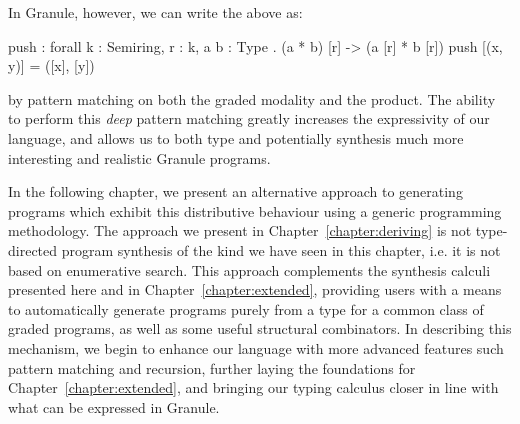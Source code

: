 In Granule, however, we can write the above as: 
\begin{granule}
push : forall {k : Semiring, r : k, a b : Type} . (a * b) [r] -> (a [r] * b [r])
push [(x, y)] = ([x], [y])
\end{granule}
by pattern matching on both the graded modality and the product. The ability to
perform this \emph{deep} pattern matching greatly increases the expressivity of
our language, and allows us to both type and potentially synthesis much more
interesting and realistic Granule programs.

In the following chapter, we present an alternative approach to generating
programs which exhibit this distributive behaviour using a generic programming
methodology. The approach we present in Chapter~\ref{chapter:deriving} is not
type-directed program synthesis of the kind we have seen in this chapter, i.e.
it is not based on enumerative search. This approach complements the synthesis
calculi presented here and in Chapter~\ref{chapter:extended}, providing users
with a means to automatically generate programs purely from a type for a common
class of graded programs, as well as some useful structural combinators. In
describing this mechanism, we begin to enhance our language with more advanced
features such pattern matching and recursion, further laying the foundations for
Chapter~\ref{chapter:extended}, and bringing our typing calculus closer in line
with what can be expressed in Granule.  


